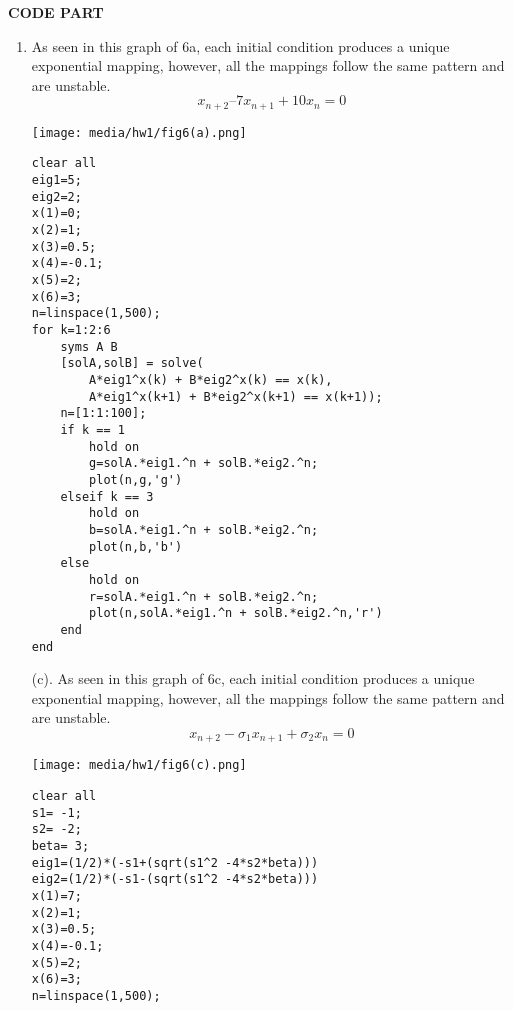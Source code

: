 \documentclass[
    classnum=MATH564,
    classname=MATHEMATICAL\ MODELING,
    due=January\ 28\,\ 2020,
    author=Gabrielle\ Streeter\qquad Hannah\ Wu\qquad\ Minghang\ Li,
    authorshort=Streeter\ \&\ Wu\ \&\ Li,
    teacher= Zachary\ M.\ Boyd,
    hw=1
]{hw-template}
\newenvironment{Figure}
  {\par\medskip\noindent\minipage{\linewidth}}
  {\endminipage\par\medskip}
\begin{document}
\pagebreak


\begin{center}
    \LARGE
    \textbf{CODE PART}
\end{center}

\begin{homeworkProblem}[6]
\begin{enumerate}
\item \begin{multicols}{2}
As seen in this graph of 6a, each initial condition produces a unique
exponential mapping, however, all the mappings follow the same pattern and are
unstable.
$$
x_{n+2} – 7x_{n+1} + 10x_n = 0
$$

\begin{Figure}
    \centering
    \texttt{[image: media/hw1/fig6(a).png]}
\end{Figure}

\end{multicols}

\begin{listing}[htbp]
    \begin{tcolorbox}
    \begin{verbatim}
clear all
eig1=5;
eig2=2;
x(1)=0;
x(2)=1;
x(3)=0.5;
x(4)=-0.1;
x(5)=2;
x(6)=3;
n=linspace(1,500);
for k=1:2:6
    syms A B
    [solA,solB] = solve(
        A*eig1^x(k) + B*eig2^x(k) == x(k),
        A*eig1^x(k+1) + B*eig2^x(k+1) == x(k+1));
    n=[1:1:100];
    if k == 1
        hold on
        g=solA.*eig1.^n + solB.*eig2.^n;
        plot(n,g,'g')
    elseif k == 3
        hold on
        b=solA.*eig1.^n + solB.*eig2.^n;
        plot(n,b,'b')
    else
        hold on
        r=solA.*eig1.^n + solB.*eig2.^n;
        plot(n,solA.*eig1.^n + solB.*eig2.^n,'r')
    end
end
    \end{verbatim}
    \end{tcolorbox}
\end{listing}
\pagebreak
\begin{multicols}{2}
(c). As seen in this graph of 6c, each initial condition produces a unique
exponential mapping, however, all the mappings follow the same pattern and are
unstable.
$$
x_{n+2} - \sigma_1 x_{n+1} + \sigma_2 x_n = 0
$$

\begin{Figure}
    \centering
    \texttt{[image: media/hw1/fig6(c).png]}
\end{Figure}
\end{multicols}
\begin{listing}[htbp]
    \begin{tcolorbox}
    \begin{verbatim}
clear all
s1= -1;
s2= -2;
beta= 3;
eig1=(1/2)*(-s1+(sqrt(s1^2 -4*s2*beta)))
eig2=(1/2)*(-s1-(sqrt(s1^2 -4*s2*beta)))
x(1)=7;
x(2)=1;
x(3)=0.5;
x(4)=-0.1;
x(5)=2;
x(6)=3;
n=linspace(1,500);


\end{verbatim}
\end{tcolorbox}
\end{listing}
\end{enumerate}
\end{homeworkProblem}
\end{document}

